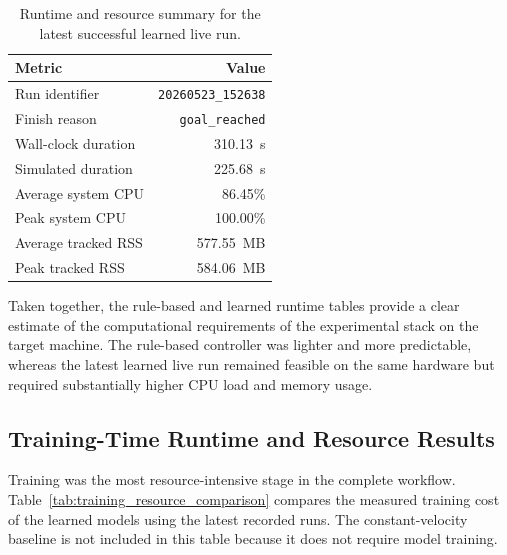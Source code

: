 \begin{table}[tbp]
    \caption{Runtime and resource summary for the latest successful learned live run.}
    \label{tab:latest_live_runtime_summary}
    \centering
    \small
    \setlength{\tabcolsep}{5pt}
    \renewcommand{\arraystretch}{1.12}
    \begin{tabular}{@{}lr@{}}
        \toprule
        \textbf{Metric} & \textbf{Value} \\
        \midrule
        Run identifier & \texttt{20260523\_152638} \\
        Finish reason & \texttt{goal\_reached} \\
        Wall-clock duration & 310.13~s \\
        Simulated duration & 225.68~s \\
        Average system CPU & 86.45\% \\
        Peak system CPU & 100.00\% \\
        Average tracked RSS & 577.55~MB \\
        Peak tracked RSS & 584.06~MB \\
        \bottomrule
    \end{tabular}
\end{table}

Taken together, the rule-based and learned runtime tables provide a clear estimate of the computational requirements of the experimental stack on the target machine. The rule-based controller was lighter and more predictable, whereas the latest learned live run remained feasible on the same hardware but required substantially higher CPU load and memory usage.

\subsection{Training-Time Runtime and Resource Results}

Training was the most resource-intensive stage in the complete workflow. Table~\ref{tab:training_resource_comparison} compares the measured training cost of the learned models using the latest recorded runs. The constant-velocity baseline is not included in this table because it does not require model training.

